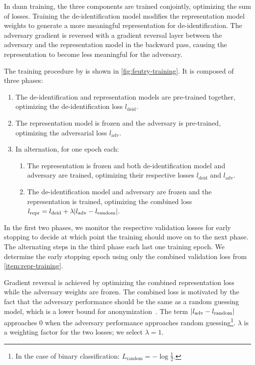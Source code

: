 \begin{description}
    In \ac{dann} training, the three components are trained conjointly, optimizing the sum of losses.
    Training the de-identification model modifies the representation model weights to generate a more meaningful representation for de-identification.
    The adversary gradient is reversed with a gradient reversal layer between the adversary and the representation model in the backward pass, causing the representation to become less meaningful for the adversary.
    
    The training procedure by \citet{feutry2018learning} is shown in \cref{fig:feutry-training}.
    It is composed of three phases:
    \begin{enumerate}[label=P\arabic*.,ref=P\arabic*]
        \item The de-identification and representation models are pre-trained together, optimizing the de-identification loss $l_{\text{deid}}$.
        \item The representation model is frozen and the adversary is pre-trained, optimizing the adversarial loss $l_{\text{adv}}$.
        \item In alternation, for one epoch each:
        \begin{enumerate}
            \item The representation is frozen and both de-identification model and adversary are trained, optimizing their respective losses $l_{\text{deid}}$ and $l_{\text{adv}}$.
            \item The de-identification model and adversary are frozen and the representation is trained, optimizing the combined loss $l_{\text{repr}} = l_{\text{deid}} + \lambda \lvert l_{\text{adv}} - l_{\text{random}}\rvert$. \label{item:repr-training}
        \end{enumerate}
    \end{enumerate}
    
    In the first two phases, we monitor the respective validation losses for early stopping to decide at which point the training should move on to the next phase.
    The alternating steps in the third phase each last one training epoch.
    We determine the early stopping epoch using only the combined validation loss from \ref{item:repr-training}.
    
    Gradient reversal is achieved by optimizing the combined representation loss while the adversary weights are frozen.
    The combined loss is motivated by the fact that the adversary performance should be the same as a random guessing model, which is a lower bound for anonymization~\citep{feutry2018learning}.
    The term $\lvert l_{\text{adv}} - l_{\text{random}}\rvert$ approaches $0$ when the adversary performance approaches random guessing\footnote{In the case of binary classification: $L_{\text{random}} = -\log \frac{1}{2}$.}.
    $\lambda$ is a weighting factor for the two losses; we select $\lambda=1$.
\end{description}

